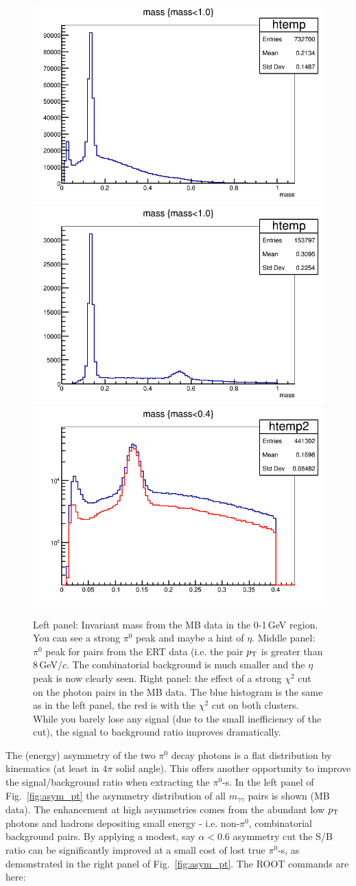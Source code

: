 \documentclass[12pt,letterpaper,aps,prc,superscriptaddress,showpacs,
longbibliography,nofootinbib,floatfix,onecolumn]{revtex4-1}
\newcommand{\pt}{\mbox{$p_{\rm T}$}\xspace}
\newcommand{\piz}{\mbox{$\pi^0$}\xspace}
\newcommand{\mgg}{\mbox{$m_{\gamma\gamma}$}\xspace}
\newcommand{\gev}{\mbox{GeV}\xspace}
\newcommand{\gevc}{\mbox{GeV/$c$}\xspace}
\begin{document}
\begin{center}
\begin{figure}[htbp]
  \includegraphics[width=0.3\linewidth]{figs/mbinvmass.png}
  \includegraphics[width=0.3\linewidth]{figs/ertinvmass.png}
  \includegraphics[width=0.3\linewidth]{figs/chi2mbinvmass.png}
  \caption{Left panel: Invariant mass from the MB data
    in the 0-1\,\gev region.  You can see a strong \piz peak
    and maybe a hint of $\eta$.
    Middle panel: \piz peak for pairs 
    from the ERT data (i.e. the pair \pt is greater than 8\,\gevc.  
    The combinatorial background is much smaller and the $\eta$ peak
    is now clearly seen.
    Right panel: the effect of a strong $\chi^2$ cut on the photon
    pairs in the MB data.  The blue histogram is the same as in the
    left panel, the red is with the $\chi^2$ cut on both clusters.
    While you barely lose any signal (due to the small inefficiency of
    the cut), the signal to background ratio improves dramatically.
  }
    \label{fig:invmass}
\end{figure}
\end{center}

The (energy) asymmetry of the two \piz decay photons is a flat
distribution by kinematics (at least in $4\pi$ solid angle).  This
offers another opportunity to improve the signal/background ratio when
extracting the \piz-s.   
In the left panel of Fig.~\ref{fig:asym_pt} the asymmetry distribution
of all \mgg pairs is shown (MB data).  The enhancement at high
asymmetries comes from the abundant low \pt photons and hadrons
depositing small energy - i.e. non-\piz, combinatorial background
pairs.  By applying a modest, say $\alpha<0.6$ asymmetry cut the S/B
ratio can be significantly improved at a small cost of lost true
\piz-s, as demonstrated in the right panel of Fig.~\ref{fig:asym_pt}. 
The ROOT commands are here:
\end{document}
